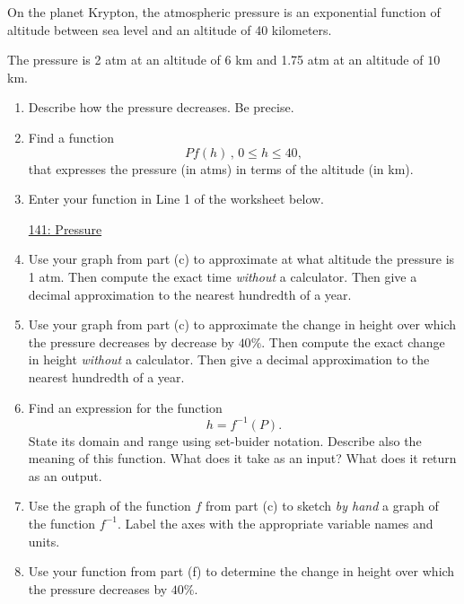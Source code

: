 \documentclass{ximera}
\begin{document}
\begin{question}  \label{Q:dfr5545656565}
On the planet Krypton, the atmospheric pressure is an exponential function of altitude between sea level and an altitude of 40 kilometers.

The pressure is 2 atm at an altitude of $6$ km and 1.75 atm at an altitude of $10$ km. 

\begin{enumerate}
\item Describe how the pressure decreases. Be precise.

\item  Find a function 
\[
 P f(h) \, , \, 0\leq h \leq 40 ,
\]
that expresses the pressure (in atms) in terms of the altitude (in km).

\item Enter your function in Line 1 of the worksheet below. 

\begin{onlineOnly}
    \begin{center}
\end{center}
\end{onlineOnly}


\href{https://www.desmos.com/calculator/zchjllaftd}{141: Pressure}



\item Use your graph from part (c) to approximate at what altitude the pressure is 1 atm. Then compute the exact time \emph{without} a calculator. Then give a decimal approximation to the nearest hundredth of a year.

\item Use your graph from part (c) to approximate the change in height over which the pressure decreases by decrease by $40\%$. Then compute the exact change in height \emph{without} a calculator. Then give a decimal approximation to the nearest hundredth of a year.

\item Find an expression for the function 
\[ 
      h  = f^{-1}(P) .
\]
State its domain and range using set-buider notation. Describe also the meaning of this function. What does it take as an input? What does it return as an output.

\item Use the graph of the function $f$ from part (c) to sketch \emph{by hand} a graph of the function $f^{-1}$. Label the axes with the appropriate variable names and units.

\item Use your function from part (f) to determine the change in height over which the pressure decreases by $40\%$.

\end{enumerate}
\end{question}
\end{document}
